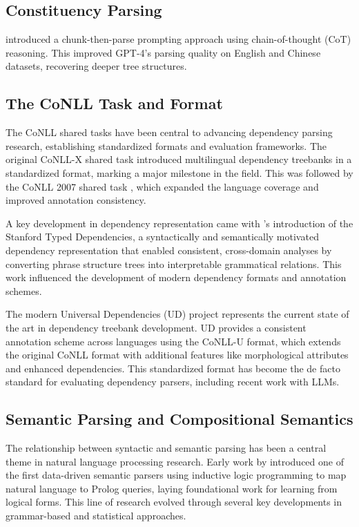 \subsection{Constituency Parsing}

\citet{tian2024chunkprompt} introduced a chunk-then-parse prompting approach using chain-of-thought (CoT) reasoning. This improved GPT-4's parsing quality on English and Chinese datasets, recovering deeper tree structures.

\subsection{The CoNLL Task and Format}

The CoNLL shared tasks have been central to advancing dependency parsing research, establishing standardized formats and evaluation frameworks. The original CoNLL-X shared task \citep{buchholz2006conll} introduced multilingual dependency treebanks in a standardized format, marking a major milestone in the field. This was followed by the CoNLL 2007 shared task \citep{nivre2007conll}, which expanded the language coverage and improved annotation consistency.

A key development in dependency representation came with \citet{de2006generating}'s introduction of the Stanford Typed Dependencies, a syntactically and semantically motivated dependency representation that enabled consistent, cross-domain analyses by converting phrase structure trees into interpretable grammatical relations. This work influenced the development of modern dependency formats and annotation schemes.

The modern Universal Dependencies (UD) project \citep{nivre2016universal} represents the current state of the art in dependency treebank development. UD provides a consistent annotation scheme across languages using the CoNLL-U format, which extends the original CoNLL format with additional features like morphological attributes and enhanced dependencies. This standardized format has become the de facto standard for evaluating dependency parsers, including recent work with LLMs.

\subsection{Semantic Parsing and Compositional Semantics}

The relationship between syntactic and semantic parsing has been a central theme in natural language processing research. Early work by \citet{zelle1996} introduced one of the first data-driven semantic parsers using inductive logic programming to map natural language to Prolog queries, laying foundational work for learning from logical forms. This line of research evolved through several key developments in grammar-based and statistical approaches.

